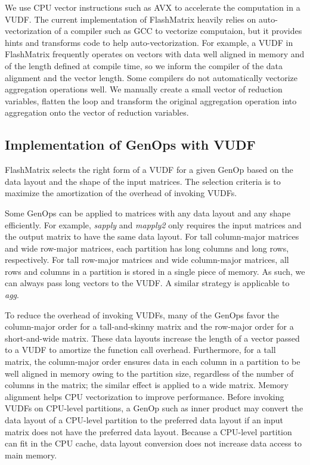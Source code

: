 We use CPU vector instructions such as AVX \cite{avx} to accelerate
the computation in a VUDF. The current implementation of FlashMatrix heavily
relies on auto-vectorization
of a compiler such as GCC to vectorize computaion, but it provides hints and
transforms code to help auto-vectorization. For example, a VUDF in FlashMatrix
frequently operates on vectors with data well aligned in memory and of
the length defined at compile time, so we inform the compiler of the data alignment
and the vector length. Some compilers do not automatically vectorize
aggregation operations well. We manually create a small vector of reduction
variables, flatten the loop and transform the original aggregation operation
into aggregation onto the vector of reduction variables.

\subsection{Implementation of GenOps with VUDF}

FlashMatrix selects the right form of a VUDF for a given GenOp based on the data
layout and the shape of the input matrices. The selection criteria is to maximize
the amortization of the overhead of invoking VUDFs.

Some GenOps can be applied to matrices with any data layout and any shape
efficiently. For example, \textit{sapply} and \textit{mapply2} only requires
the input matrices and the output matrix to have the same data layout. For tall
column-major matrices and wide row-major matrices,
each partition has long columns and long rows, respectively. For tall row-major
matrices and wide column-major matrices, all rows and columns in a partition
is stored in a single piece of memory. As such, we can always pass long vectors
to the VUDF. A similar strategy is applicable to \textit{agg}.

To reduce the overhead of invoking VUDFs, many of the GenOps favor
the column-major order for a tall-and-skinny matrix and the row-major order
for a short-and-wide matrix. These data layouts increase
the length of a vector passed to a VUDF to amortize the function call overhead.
Furthermore, for
a tall matrix, the column-major order ensures data in each column in a partition
to be well aligned in memory owing to the partition size, regardless of
the number of columns in the matrix; the similar effect is applied to a wide
matrix. Memory alignment helps CPU vectorization to improve performance.
Before invoking VUDFs on CPU-level partitions, a GenOp such as inner product
may convert the data layout of a CPU-level partition to the preferred data
layout if an input matrix does not have the preferred data layout.
Because a CPU-level partition can fit in the CPU cache, data layout conversion
does not increase data access to main memory. 

